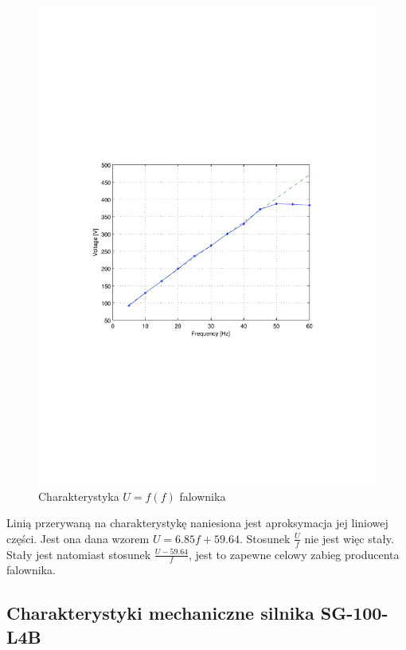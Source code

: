 \documentclass[12pt]{article}
\begin{document}
\begin{figure}[!htb]
	\begin{center}
		\includegraphics[trim=5cm 9cm 5cm 9cm]{../res/img/U_f(f).pdf} 
	\end{center}
	\caption{Charakterystyka $U=f(f)$ falownika}
\end{figure}

Linią przerywaną na charakterystykę naniesiona jest aproksymacja jej liniowej
części. Jest ona dana wzorem $U=6.85f+59.64$. Stosunek $\frac{U}{f}$ nie jest
więc stały. Stały jest natomiast stosunek $\frac{U-59.64}{f}$, jest to zapewne
celowy zabieg producenta falownika.

\newpage

\subsection{Charakterystyki mechaniczne silnika SG-100-L4B}
\end{document}
